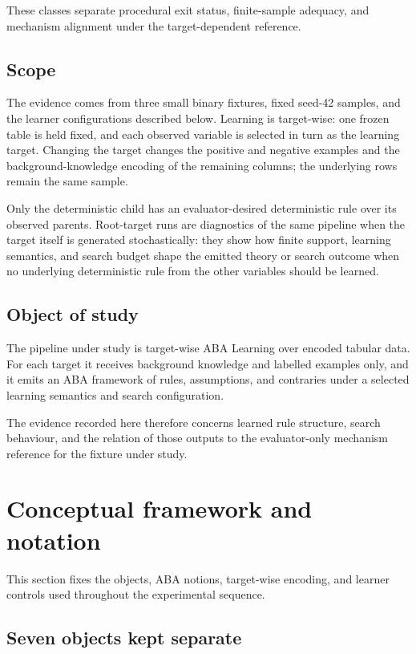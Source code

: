 \documentclass[11pt]{article}
\begin{document}
These classes separate procedural exit status, finite-sample adequacy, and
mechanism alignment under the target-dependent reference.

\subsection{Scope}

The evidence comes from three small binary fixtures, fixed seed-42 samples,
and the learner configurations described below. Learning is target-wise: one
frozen table is held fixed, and each observed variable is selected in turn as
the learning target. Changing the target changes the positive and negative
examples and the background-knowledge encoding of the remaining columns; the
underlying rows remain the same sample.

Only the deterministic child has an evaluator-desired deterministic rule over
its observed parents. Root-target runs are diagnostics of the same pipeline
when the target itself is generated stochastically: they show how finite
support, learning semantics, and search budget shape the emitted theory or
search outcome when no underlying deterministic rule from the other variables
should be learned.

\subsection{Object of study}

The pipeline under study is target-wise ABA Learning over encoded tabular
data. For each target it receives background knowledge and labelled examples
only, and it emits an ABA framework of rules, assumptions, and contraries
under a selected learning semantics and search configuration.

The evidence recorded here therefore concerns learned rule structure, search
behaviour, and the relation of those outputs to the evaluator-only mechanism
reference for the fixture under study.

\section{Conceptual framework and notation}

This section fixes the objects, ABA notions, target-wise encoding, and
learner controls used throughout the experimental sequence.

\subsection{Seven objects kept separate}
\end{document}
